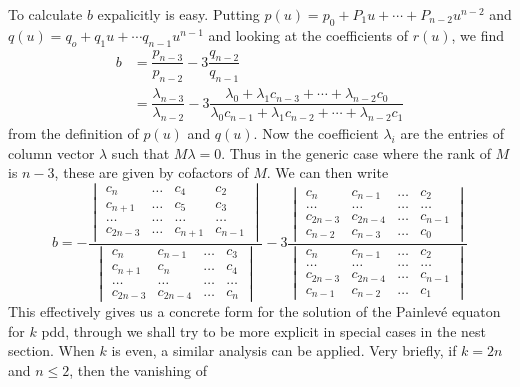 To calculate $b$ expalicitly is easy. Putting $p(u) = p_{0}+P_{1}u+ \cdots+P_{n-2}u^{n-2}$
and $q(u) =q_{o} +q_{1}u +\cdots q_{n-1}u^{n-1}$ and looking at the coefficients of $r(u)$, we find
\begin{align*}
b &= \dfrac{p_{n-3}}{p_{n-2}}-3\dfrac{q_{n-2}}{q_{n-1}}\\
  &= \dfrac{\lambda_{n-3}}{\lambda_{n-2}}-3\dfrac{\lambda_{0}+\lambda_{1}c_{n-3}+ \cdots + \lambda_{n-2}c_{0}}{\lambda_{0}c_{n-1} + \lambda_{1}c_{n-2}+\cdots + \lambda_{n-2}c_{1}}
\end{align*}
from the definition of $p(u)$ and $q(u)$. Now the coefficient $\lambda_{i}$ are the entries of column vector $\lambda$ such that $M\lambda =0$. Thus in the generic case where the rank of $M$ is $n-3$, these are given by cofactors of $M$. We can then write
\begin{equation}\label{art7-eq-19}
b =
-\dfrac{\begin{vmatrix}
c_{n} & \ldots & c_{4} & c_{2}\\
c_{n+1}& \ldots & c_{5} & c_{3}\\
\ldots & \ldots & \ldots & \ldots\\
c_{2n-3} & \ldots & c_{n+1} & c_{n-1}
\end{vmatrix}}{\begin{vmatrix}
c_{n} & c_{n-1} & \ldots   & c_{3}\\
c_{n+1}& c_{n} &\ldots   & c_{4}\\
\ldots & \ldots & \ldots & \ldots\\
c_{2n-3} & c_{2n-4} & \ldots &  c_{n}
\end{vmatrix}}
-3
\dfrac{\begin{vmatrix}
c_{n} & c_{n-1} & \ldots   & c_{2}\\
\ldots & \ldots & \ldots & \ldots\\
c_{2n-3} & c_{2n-4} & \ldots &  c_{n-1}\\
c_{n-2} & c_{n-3} & \ldots &  c_{0}
\end{vmatrix}}{\begin{vmatrix}
c_{n} & c_{n-1} & \ldots   & c_{2}\\
\ldots & \ldots & \ldots & \ldots\\
c_{2n-3} & c_{2n-4} & \ldots &  c_{n-1}\\
c_{n-1} & c_{n-2} & \ldots &  c_{1}
\end{vmatrix}}
\end{equation}
This effectively gives us a concrete form for the solution of the Painlev\'e equaton for $k$ pdd, through we shall try to be more explicit in special cases in the nest section. When $k$ is even, a similar analysis can be applied. Very briefly, if $k=2n$ and $n\leq 2$, then the vanishing of
